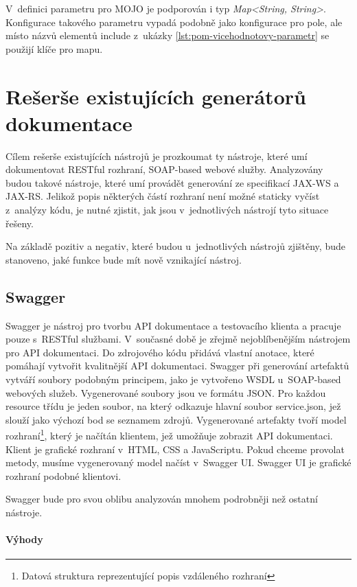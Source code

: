 \documentclass[11pt,twoside,a4paper]{book}
\begin{document}
V~definici parametru pro MOJO je podporován i typ {\em Map<String, String>}.
Konfigurace takového parametru vypadá podobně jako konfigurace pro pole, ale místo názvů elementů
include z~ukázky \ref{lst:pom-vicehodnotovy-parametr} se použijí klíče pro mapu.

\section{Rešerše existujících generátorů dokumentace}
\label{sec:reserse-existujicich-generatoru}

Cílem rešerše existujících nástrojů je prozkoumat ty nástroje, které umí
dokumentovat RESTful rozhraní, SOAP-based webové služby. Analyzovány budou
takové nástroje, které umí provádět generování ze specifikací JAX-WS a JAX-RS.
Jelikož popis některých částí rozhraní není možné staticky vyčíst z~analýzy
kódu, je nutné zjistit, jak jsou v~jednotlivých nástrojí tyto situace řešeny.

Na základě pozitiv a negativ, které budou u~jednotlivých nástrojů zjištěny, bude stanoveno,
jaké funkce bude mít nově vznikající nástroj.

\subsection{Swagger}
\label{subsec:swagger}

Swagger \cite{SwaggerHome} je nástroj pro tvorbu API dokumentace a testovacího
klienta a pracuje pouze s~RESTful službami.
V~současné době je zřejmě nejoblíbenějším nástrojem pro API dokumentaci. Do
zdrojového kódu přidává vlastní anotace, které pomáhají vytvořit kvalitnější API
dokumentaci. Swagger při generování artefaktů vytváří soubory podobným
principem, jako je vytvořeno WSDL u~SOAP-based webových služeb. Vygenerované
soubory jsou ve formátu JSON. Pro každou resource třídu je jeden soubor, na
který odkazuje hlavní soubor service.json, jež slouží jako výchozí bod se
seznamem zdrojů. Vygenerované artefakty tvoří model rozhraní\footnote{Datová
struktura reprezentující popis vzdáleného rozhraní}, který je načítán klientem,
jež umožňuje zobrazit API dokumentaci.
Klient je grafické rozhraní v~HTML, CSS a JavaScriptu. Pokud chceme provolat
metody, musíme vygenerovaný model načíst v~Swagger UI. Swagger UI je grafické
rozhraní podobné klientovi.

Swagger bude pro svou oblibu analyzován mnohem podrobněji než ostatní nástroje.

\paragraph{Výhody}
\end{document}
